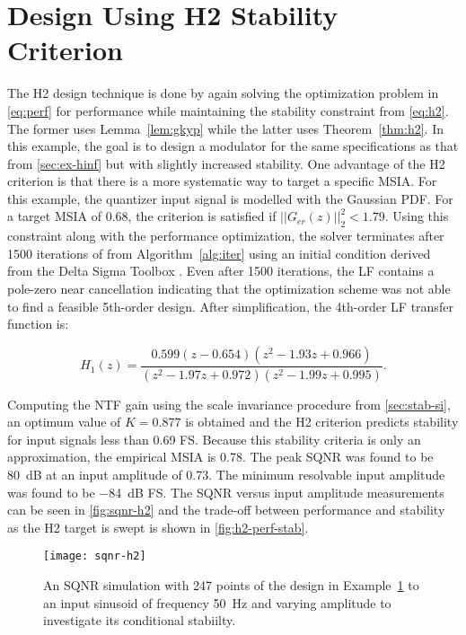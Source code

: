 \section{Design Using \gls{H2} Stability Criterion}
\label{sec:ex-h2}

The \gls{H2} design technique is done by again solving the optimization problem in \autoref{eq:perf} for performance while maintaining the stability constraint from \autoref{eq:h2}. The former uses Lemma~\ref{lem:gkyp} while the latter uses Theorem~\ref{thm:h2}. In this example, the goal is to design a modulator for the same specifications as that from \autoref{sec:ex-hinf} but with slightly increased stability. One advantage of the \gls{H2} criterion is that there is a more systematic way to target a specific \gls{MSIA}. For this example, the quantizer input signal is modelled with the Gaussian \gls{PDF}. For a target \gls{MSIA} of 0.68, the criterion is satisfied if $||G_{er}(z)||^2_2<1.79$. Using this constraint along with the performance optimization, the solver terminates after 1500 iterations of  from Algorithm~\ref{alg:iter} using an initial condition derived from the Delta Sigma Toolbox \cite[Appx. B]{Schreier1997}. Even after 1500 iterations, the \gls{LF} contains a pole-zero near cancellation indicating that the optimization scheme was not able to find a feasible 5th-order design. After simplification, the 4th-order \gls{LF} transfer function is:

\begin{equation*}
	H_1(z) = \frac{0.599\left(z - 0.654\right)\left(z^2 - 1.93z + 0.966\right)}{\left(z^2 - 1.97z + 0.972\right)\left(z^2 - 1.99z + 0.995\right)}.
\end{equation*}

Computing the NTF gain using the scale invariance procedure from \autoref{sec:stab-si}, an optimum value of $K = 0.877$ is obtained and the \gls{H2} criterion predicts stability for input signals less than 0.69 \gls{FS}. Because this stability criteria is only an approximation, the empirical \gls{MSIA} is 0.78. The peak SQNR was found to be \SI{80}{\deci\bel} at an input amplitude of 0.73. The minimum resolvable input amplitude was found to be \SI{-84}{\deci\bel} \gls{FS}. The \gls{SQNR} versus input amplitude measurements can be seen in \autoref{fig:sqnr-h2} and the trade-off between performance and stability as the \gls{H2} target is swept is shown in \autoref{fig:h2-perf-stab}.

\begin{figure}
	\centering
	\texttt{[image: sqnr-h2]}
	\caption{An SQNR simulation with 247 points of the design in Example~\ref{sec:ex-h2} to an input sinusoid of frequency \SI{50}{\hertz} and varying amplitude to investigate its conditional stabiilty.} \label{fig:sqnr-h2}
\end{figure}

